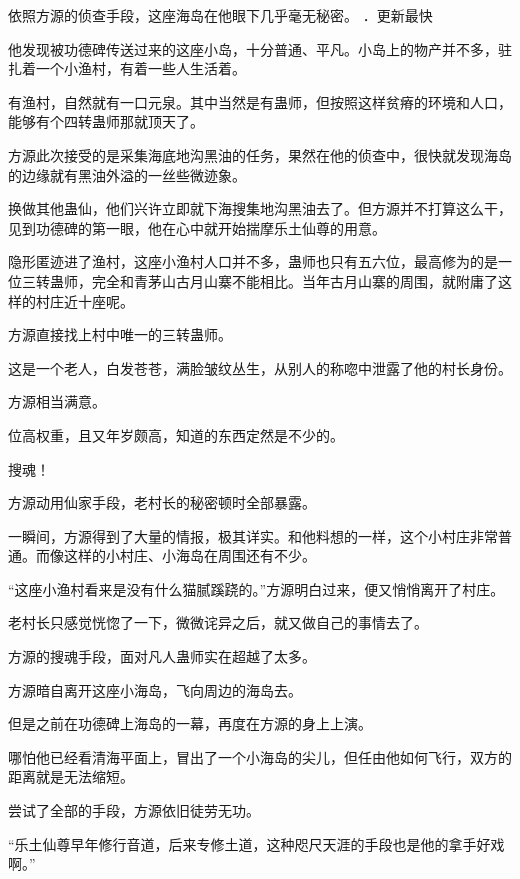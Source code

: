 
\begin{this_body}

依照方源的侦查手段，这座海岛在他眼下几乎毫无秘密。 ．更新最快

他发现被功德碑传送过来的这座小岛，十分普通、平凡。小岛上的物产并不多，驻扎着一个小渔村，有着一些人生活着。

有渔村，自然就有一口元泉。其中当然是有蛊师，但按照这样贫瘠的环境和人口，能够有个四转蛊师那就顶天了。

方源此次接受的是采集海底地沟黑油的任务，果然在他的侦查中，很快就发现海岛的边缘就有黑油外溢的一丝些微迹象。

换做其他蛊仙，他们兴许立即就下海搜集地沟黑油去了。但方源并不打算这么干，见到功德碑的第一眼，他在心中就开始揣摩乐土仙尊的用意。

隐形匿迹进了渔村，这座小渔村人口并不多，蛊师也只有五六位，最高修为的是一位三转蛊师，完全和青茅山古月山寨不能相比。当年古月山寨的周围，就附庸了这样的村庄近十座呢。

方源直接找上村中唯一的三转蛊师。

这是一个老人，白发苍苍，满脸皱纹丛生，从别人的称唿中泄露了他的村长身份。

方源相当满意。

位高权重，且又年岁颇高，知道的东西定然是不少的。

搜魂！

方源动用仙家手段，老村长的秘密顿时全部暴露。

一瞬间，方源得到了大量的情报，极其详实。和他料想的一样，这个小村庄非常普通。而像这样的小村庄、小海岛在周围还有不少。

“这座小渔村看来是没有什么猫腻蹊跷的。”方源明白过来，便又悄悄离开了村庄。

老村长只感觉恍惚了一下，微微诧异之后，就又做自己的事情去了。

方源的搜魂手段，面对凡人蛊师实在超越了太多。

方源暗自离开这座小海岛，飞向周边的海岛去。

但是之前在功德碑上海岛的一幕，再度在方源的身上上演。

哪怕他已经看清海平面上，冒出了一个小海岛的尖儿，但任由他如何飞行，双方的距离就是无法缩短。

尝试了全部的手段，方源依旧徒劳无功。

“乐土仙尊早年修行音道，后来专修土道，这种咫尺天涯的手段也是他的拿手好戏啊。”


\end{this_body}
